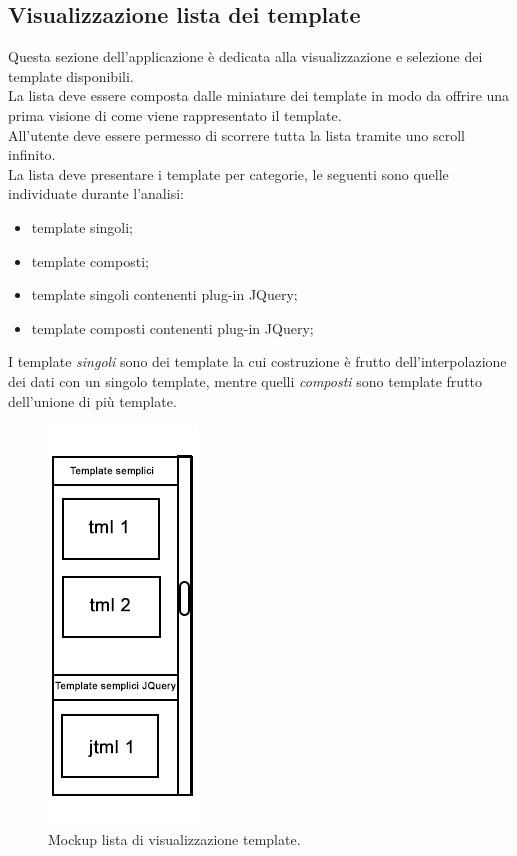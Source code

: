 \subsection{Visualizzazione lista dei template} \label{subsec:visualizzazione_template}
Questa sezione dell'applicazione è dedicata alla visualizzazione e selezione dei template disponibili.\\
La lista deve essere composta dalle miniature dei template in modo da offrire una prima visione di come viene rappresentato il template.\\
All'utente deve essere permesso di scorrere tutta la lista tramite uno scroll infinito.\\
La lista deve presentare i template per categorie, le seguenti sono quelle individuate durante l'analisi:
\begin{itemize}
	\item template singoli;
	\item template composti;
	\item template singoli contenenti plug-in JQuery;
	\item template composti contenenti plug-in JQuery;
\end{itemize}
I template \textit{singoli} sono dei template la cui costruzione è frutto dell'interpolazione dei dati con un singolo template, mentre quelli \textit{composti} sono template frutto dell'unione di più template.\\
\begin{figure}[htp]
	\centering
	\includegraphics[scale=0.5]{../immagini/mockup_lista}
	\caption{Mockup lista di visualizzazione template.}
\end{figure}

